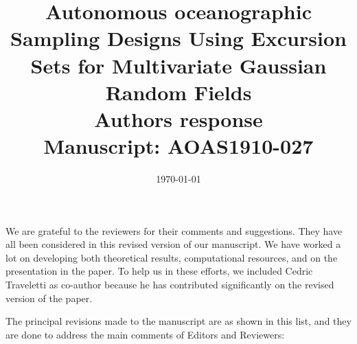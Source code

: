 \documentclass[a4paper]{article}
\newcounter{reviewer}
\begin{document}
\title{Autonomous oceanographic Sampling Designs Using Excursion Sets for Multivariate Gaussian Random Fields
  \\\vspace{5mm}
 Authors response
  \\\vspace{5mm}
\small{Manuscript: AOAS1910-027}}
\author{ }

\date{\today}

\maketitle

We are grateful to the reviewers for their comments and
suggestions. They have all been considered in this revised
version of our manuscript. We have worked a lot on developing both theoretical results, computational resources, and on the presentation in the paper. To help us in these efforts, we included Cedric Traveletti as co-author because he has contributed significantly on the revised version of the paper. 

The principal revisions made to the manuscript are as shown in this list, and they are done to address the main comments of Editors and Reviewers:
\end{document}

